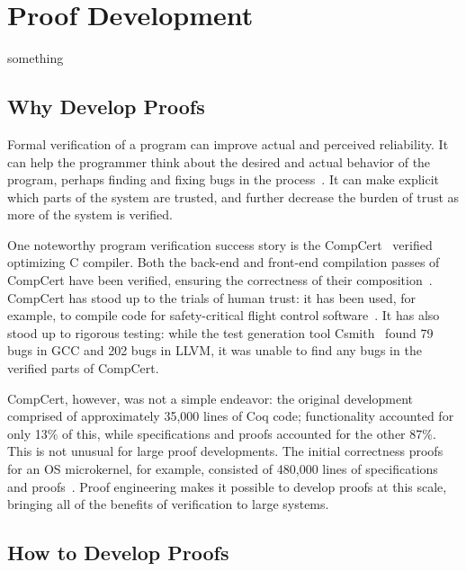 
\section{Proof Development}


something

\subsection{Why Develop Proofs}

Formal verification of a program can improve actual and perceived reliability.
It can help the programmer think about the desired and actual behavior of the program,
perhaps finding and fixing bugs in the process~\cite{murraybp}.
It can make explicit which parts of the system are trusted, and further decrease the burden
of trust as more of the system is verified.

One noteworthy program verification success story is the CompCert~\cite{Leroy:POPL06, Leroy2009} verified optimizing C compiler.
Both the back-end and front-end compilation passes
of CompCert have been verified, ensuring the correctness of their composition~\cite{Kaestner2017}.
CompCert has stood up to the trials of human trust: it has been used, for example, to compile code for safety-critical flight control software~\cite{Frana2011}.
It has also stood up to rigorous testing: while the test generation tool Csmith~\cite{Yang2011} found 
79 bugs in GCC and 202 bugs in LLVM, it was unable to find any bugs in the verified parts of CompCert.

CompCert, however, was not a simple endeavor: the original development comprised of approximately 35,000 lines of Coq code;
functionality accounted for only 13\% of this, while specifications and proofs accounted for the other 87\%.
This is not unusual for large proof developments. The initial correctness proofs for an OS microkernel,
for example, consisted of 480,000 lines of specifications and proofs~\cite{Klein2014micro}.
Proof engineering makes it possible to develop proofs at this scale,
bringing all of the benefits of verification to large systems.

\subsection{How to Develop Proofs}

